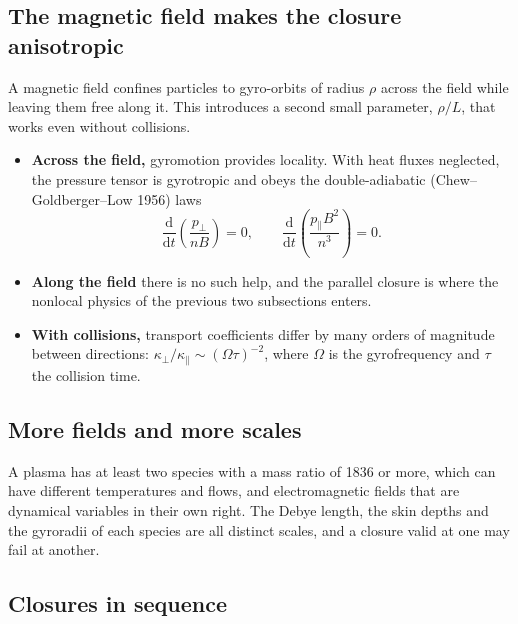 \documentclass[11pt]{article}
\newcommand{\dd}{\mathrm{d}}
\begin{document}
\subsection{The magnetic field makes the closure anisotropic}

A magnetic field confines particles to gyro-orbits of radius $\rho$ across
the field while leaving them free along it. This introduces a second small
parameter, $\rho/L$, that works even without collisions.
\begin{itemize}
  \item \textbf{Across the field,} gyromotion provides locality. With heat
    fluxes neglected, the pressure tensor is gyrotropic and obeys the
    double-adiabatic (Chew--Goldberger--Low 1956) laws
    \[
      \frac{\dd}{\dd t}\!\left(\frac{p_\perp}{nB}\right) = 0,
      \qquad
      \frac{\dd}{\dd t}\!\left(\frac{p_\parallel B^2}{n^3}\right) = 0 .
    \]
  \item \textbf{Along the field} there is no such help, and the parallel
    closure is where the nonlocal physics of the previous two subsections
    enters.
  \item \textbf{With collisions,} transport coefficients differ by many
    orders of magnitude between directions:
    $\kappa_\perp/\kappa_\parallel \sim (\Omega\tau)^{-2}$, where $\Omega$
    is the gyrofrequency and $\tau$ the collision time.
\end{itemize}

\subsection{More fields and more scales}

A plasma has at least two species with a mass ratio of 1836 or more, which
can have different temperatures and flows, and electromagnetic fields that
are dynamical variables in their own right. The Debye length, the skin
depths and the gyroradii of each species are all distinct scales, and a
closure valid at one may fail at another.

\subsection{Closures in sequence}
\end{document}
